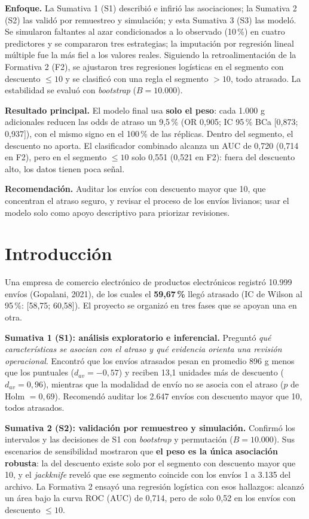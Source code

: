 \documentclass[11pt,a4paper]{article}
\begin{document}
\textbf{Enfoque.} La Sumativa 1 (S1) describió e infirió las asociaciones; la Sumativa 2 (S2) las validó por remuestreo y simulación; y esta Sumativa 3 (S3) las modeló. Se simularon faltantes al azar condicionados a lo observado (10\,\%) en cuatro predictores y se compararon tres estrategias; la imputación por regresión lineal múltiple fue la más fiel a los valores reales. Siguiendo la retroalimentación de la Formativa 2 (F2), se ajustaron tres regresiones logísticas en el segmento con descuento $\le 10$ y se clasificó con una regla el segmento $> 10$, todo atrasado. La estabilidad se evaluó con \emph{bootstrap} ($B = 10.000$).

\textbf{Resultado principal.} El modelo final usa \textbf{solo el peso}: cada 1.000 g adicionales reducen las odds de atraso un 9,5\,\% (OR 0,905; IC 95\,\% BCa [0,873; 0,937]), con el mismo signo en el 100\,\% de las réplicas. Dentro del segmento, el descuento no aporta. El clasificador combinado alcanza un AUC de 0,720 (0,714 en F2), pero en el segmento $\le 10$ solo 0,551 (0,521 en F2): fuera del descuento alto, los datos tienen poca señal.

\textbf{Recomendación.} Auditar los envíos con descuento mayor que 10, que concentran el atraso seguro, y revisar el proceso de los envíos livianos; usar el modelo solo como apoyo descriptivo para priorizar revisiones.

\section{Introducción}
Una empresa de comercio electrónico de productos electrónicos registró 10.999 envíos (Gopalani, 2021), de los cuales el \textbf{59,67\,\%} llegó atrasado (IC de Wilson al 95\,\%: [58,75; 60,58]). El proyecto se organizó en tres fases que se apoyan una en otra.

\textbf{Sumativa 1 (S1): análisis exploratorio e inferencial.} Preguntó \emph{qué características se asocian con el atraso y qué evidencia orienta una revisión operacional}. Encontró que los envíos atrasados pesan en promedio 896 g menos que los puntuales ($d_{av} = -0{,}57$) y reciben 13,1 unidades más de descuento ($d_{av} = 0{,}96$), mientras que la modalidad de envío no se asocia con el atraso ($p$ de Holm $= 0{,}69$). Recomendó auditar los 2.647 envíos con descuento mayor que 10, todos atrasados.

\textbf{Sumativa 2 (S2): validación por remuestreo y simulación.} Confirmó los intervalos y las decisiones de S1 con \emph{bootstrap} y permutación ($B = 10.000$). Sus escenarios de sensibilidad mostraron que \textbf{el peso es la única asociación robusta}: la del descuento existe solo por el segmento con descuento mayor que 10, y el \emph{jackknife} reveló que ese segmento coincide con los envíos 1 a 3.135 del archivo. La Formativa 2 ensayó una regresión logística con esos hallazgos: alcanzó un área bajo la curva ROC (AUC) de 0,714, pero de solo 0,52 en los envíos con descuento $\le 10$.
\end{document}

